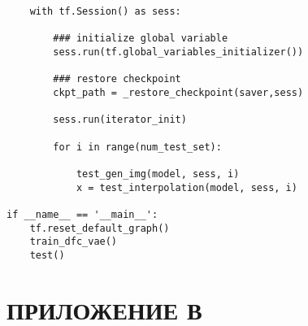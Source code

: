 \begin{footnotesize}
\begin{lstlisting}
    with tf.Session() as sess:

        ### initialize global variable
        sess.run(tf.global_variables_initializer())
        
        ### restore checkpoint
        ckpt_path = _restore_checkpoint(saver,sess)

        sess.run(iterator_init)
        
        for i in range(num_test_set):
            
            test_gen_img(model, sess, i)
            x = test_interpolation(model, sess, i)
        
if __name__ == '__main__':
    tf.reset_default_graph()
    train_dfc_vae()
    test()
\end{lstlisting}
\end{footnotesize}

\chapter*{ПРИЛОЖЕНИЕ В}
